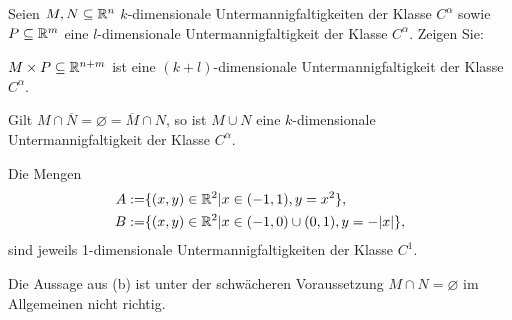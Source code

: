 \begin{Problem}
	Seien $M,N\subseteq \mathbb{R}^n$ $k$-dimensionale Untermannigfaltigkeiten der Klasse $C^\alpha$ sowie $P\subseteq \mathbb{R}^m$ eine $l$-dimensionale Untermannigfaltigkeit der Klasse $C^\alpha$. Zeigen Sie:
	\begin{parts}
		\item $M\times P\subseteq \mathbb{R}^{n+m}$ ist eine $(k+l)$-dimensionale Untermannigfaltigkeit der Klasse $C^\alpha$.
		\item Gilt $M\cap \overline{N}=\varnothing = \overline{M}\cap N$, so ist $M\cup N$ eine $k$-dimensionale Untermannigfaltigkeit der Klasse $C^\alpha$.
		\item Die Mengen
			\begin{align*}
				A:=& \{(x,y)\in \mathbb{R}^2|x\in (-1,1),y=x^2\} ,\\
				B:=& \{(x,y)\in \mathbb{R}^2|x\in (-1,0)\cup (0,1),y=-|x|\} ,
			\end{align*}
			sind jeweils 1-dimensionale Untermannigfaltigkeiten der Klasse $C^1$.
		\item Die Aussage aus (b) ist unter der schwächeren Voraussetzung $M \cap N = \varnothing$ im Allgemeinen nicht richtig.
		\end{parts}
\end{Problem}
